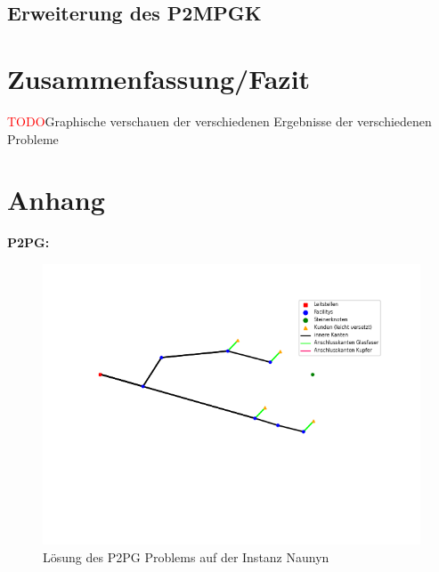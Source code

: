 \documentclass[11pt,a4paper]{article}
\newcommand{\TODO}{\textcolor{red}{TODO}}
\theoremstyle{my_th_style1}
\begin{document}
   
 \subsection{Erweiterung des P2MPGK}
 
 \section{Zusammenfassung/Fazit}
 \TODO Graphische verschauen der verschiedenen Ergebnisse der verschiedenen Probleme
 
 
\newpage

\renewcommand{\refname}{Literaturverzeichnis}

\thispagestyle{empty}
\newpage
\appendix
\section*{Anhang}
\textbf{P2PG:}
\begin{figure}[h]
	\begin{center}
		\begin{minipage}{8.0cm}
			\includegraphics[width=1\textwidth]{./Bilder/P2PG_Naunyn}
			\caption{Lösung des P2PG Problems auf der Instanz Naunyn}
		\end{minipage}
	\end{center}
\end{figure}
\end{document}
